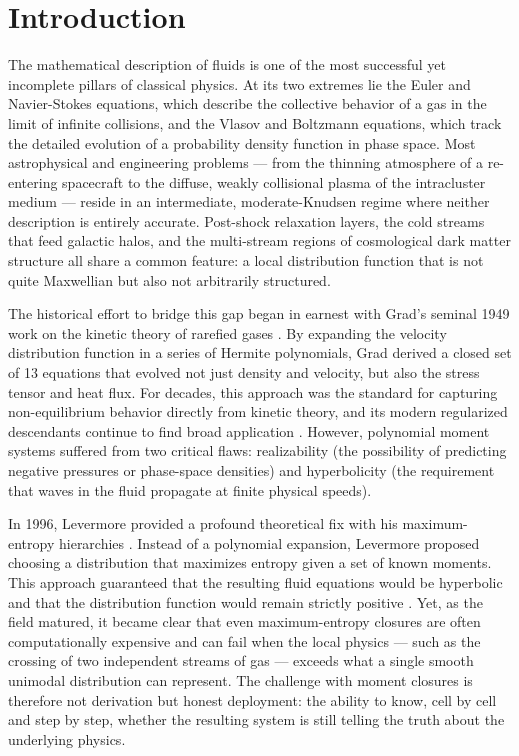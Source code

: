 \documentclass[11pt,letterpaper]{article}
\begin{document}
\section{Introduction}

The mathematical description of fluids is one of the most successful yet incomplete pillars of classical physics. At its two extremes lie the Euler and Navier-Stokes equations, which describe the collective behavior of a gas in the limit of infinite collisions, and the Vlasov and Boltzmann equations, which track the detailed evolution of a probability density function in phase space. Most astrophysical and engineering problems --- from the thinning atmosphere of a re-entering spacecraft to the diffuse, weakly collisional plasma of the intracluster medium --- reside in an intermediate, moderate-Knudsen regime where neither description is entirely accurate. Post-shock relaxation layers, the cold streams that feed galactic halos, and the multi-stream regions of cosmological dark matter structure all share a common feature: a local distribution function that is not quite Maxwellian but also not arbitrarily structured. 

The historical effort to bridge this gap began in earnest with Grad's seminal 1949 work on the kinetic theory of rarefied gases \cite{Grad1949}. By expanding the velocity distribution function in a series of Hermite polynomials, Grad derived a closed set of 13 equations that evolved not just density and velocity, but also the stress tensor and heat flux. For decades, this approach was the standard for capturing non-equilibrium behavior directly from kinetic theory, and its modern regularized descendants continue to find broad application \cite{Struchtrup2003}. However, polynomial moment systems suffered from two critical flaws: realizability (the possibility of predicting negative pressures or phase-space densities) and hyperbolicity (the requirement that waves in the fluid propagate at finite physical speeds). 

In 1996, Levermore provided a profound theoretical fix with his maximum-entropy hierarchies \cite{Levermore1996}. Instead of a polynomial expansion, Levermore proposed choosing a distribution that maximizes entropy given a set of known moments. This approach guaranteed that the resulting fluid equations would be hyperbolic and that the distribution function would remain strictly positive \cite{Groth2009}. Yet, as the field matured, it became clear that even maximum-entropy closures are often computationally expensive and can fail when the local physics --- such as the crossing of two independent streams of gas --- exceeds what a single smooth unimodal distribution can represent. The challenge with moment closures is therefore not derivation but honest deployment: the ability to know, cell by cell and step by step, whether the resulting system is still telling the truth about the underlying physics.
\end{document}
